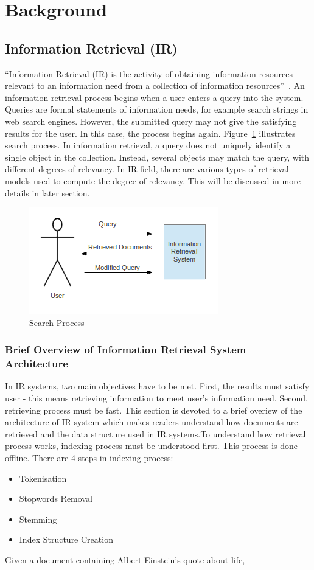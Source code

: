 
\section{Background}\label{section:background}

\subsection{Information Retrieval (IR)}
``Information Retrieval (IR) is the activity of obtaining information resources relevant to an information need from a collection of information resources''~\cite{IR}. 
An information retrieval process begins when a user 
enters a query into the system. Queries are formal statements of information needs, for example search strings in web search engines. However, the 
submitted query may not give the satisfying results for the user. In this case, the process begins again. Figure~\ref{fig:retrieval_process} illustrates
search process.
In information retrieval, a query does not uniquely identify a single object in the collection. Instead, several objects may match the query, 
with different degrees of relevancy. In IR field, there are various types of retrieval models used to compute the degree of relevancy. This will
be discussed in more details in later section.

\begin{figure}
\centering
\includegraphics[scale=1]{./figures/retrieval_process.png}
\caption{Search Process} \label{fig:retrieval_process} 
\end{figure}

\subsubsection{Brief Overview of Information Retrieval System Architecture}\label{section:IRarchitecture}
In IR systems, two main objectives have to be met. First, the results must satisfy user - this means retrieving information to meet user's
information need. Second, retrieving process must be fast. This section is devoted to a brief overiew of the architecture of IR system which makes readers
understand how documents are retrieved and the data structure used in IR systems.To understand how retrieval process works, indexing process
must be understood first. This process is done offline. There are 4 steps in indexing process:
\begin{itemize}
 \item Tokenisation
 \item Stopwords Removal
 \item Stemming
 \item Index Structure Creation
\end{itemize}
Given a document containing Albert Einstein's quote about life,

